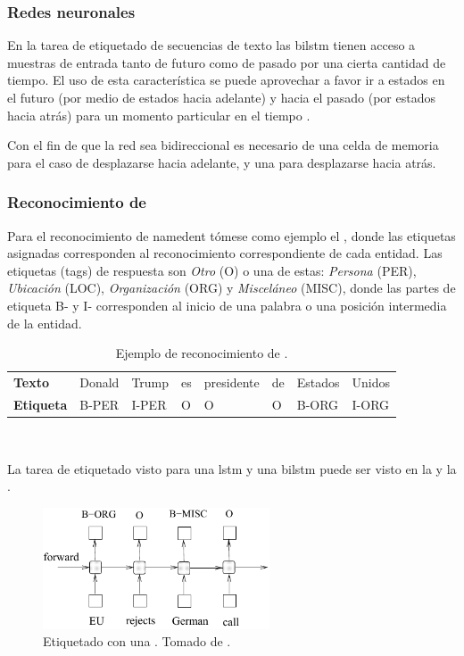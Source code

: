 \subsubsection{Redes neuronales }
En la tarea de etiquetado de secuencias de texto las \gls{bilstm} tienen acceso a muestras de entrada tanto de futuro como de pasado por una cierta cantidad de tiempo. El uso de esta característica se puede aprovechar a favor ir a estados en el futuro (por medio de estados hacia adelante) y hacia el pasado (por estados hacia atrás) para un momento particular en el tiempo \cite{Huang2015}.

Con el fin de que la red sea bidireccional es necesario de una celda de memoria para el caso de desplazarse hacia adelante, y una para desplazarse hacia atrás.

\subsubsection{Reconocimiento de }
Para el reconocimiento de \gls{namedent} tómese como ejemplo el , donde las etiquetas asignadas corresponden al reconocimiento correspondiente de cada entidad.
Las etiquetas (tags) de respuesta son \emph{Otro} (\textsc{O}) o una de estas: \emph{Persona} (\textsc{PER}), \emph{Ubicación} (\textsc{LOC}), \emph{Organización} (\textsc{ORG}) y \emph{Misceláneo} (\textsc{MISC}), donde las partes de etiqueta \textsc{B-} y \textsc{I-} corresponden al inicio de una palabra o una posición intermedia de la entidad.

\begin{table}[H]
  \centering
  \begin{tabular}{l|lllllll}
    \textbf{Texto}    & Donald   & Trump & es & presidente & de & Estados & Unidos \\
    \textbf{Etiqueta} & B-PER    & I-PER & O  & O          & O  & B-ORG   & I-ORG
  \end{tabular}
  \\ [1em]
  \decoRule
  \caption{Ejemplo de reconocimiento de .}
  \label{table:namedent-example}
\end{table}

La tarea de etiquetado visto para una \gls{lstm} y una \gls{bilstm} puede ser visto en la  y la .

\begin{figure}[H]
  \centering
  \includegraphics[width=0.6\textwidth]{Figures/lstm-arch.pdf}
\decoRule
\caption[Etiquetado con una ]{Etiquetado con una . Tomado de \cite{Huang2015}.}
\label{fig:lstm-arch}
\end{figure}


